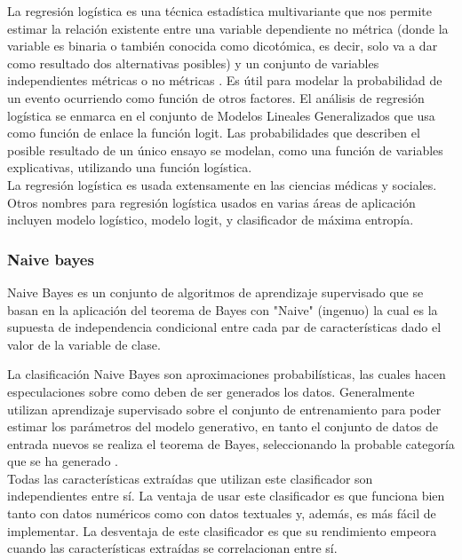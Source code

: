 La regresión logística es una técnica estadística multivariante que nos permite estimar la relación existente entre una variable dependiente 
no métrica (donde la variable es binaria o también conocida como dicotómica, es decir, solo va a dar como resultado dos alternativas posibles) 
y un conjunto de variables independientes métricas o no métricas \citep{CT6}. Es útil para modelar la probabilidad de un evento ocurriendo como 
función de otros factores. El análisis de regresión logística se enmarca en el conjunto de Modelos Lineales Generalizados que usa como función de 
enlace la función logit. Las probabilidades que describen el posible resultado de un único ensayo se modelan, como una función de variables explicativas, 
utilizando una función logística.\\

La regresión logística es usada extensamente en las ciencias médicas y sociales. Otros nombres para regresión logística usados en varias áreas de 
aplicación incluyen modelo logístico, modelo logit, y clasificador de máxima entropía.


\subsubsection{Naive bayes}

Naive Bayes es un conjunto de algoritmos de aprendizaje supervisado que se basan en la aplicación del teorema de Bayes con "Naive" 
(ingenuo) la cual es la supuesta de independencia condicional entre cada par de características dado el valor de la variable de clase. 

La clasificación Naive Bayes son aproximaciones probabilísticas, las cuales hacen especulaciones sobre como deben de ser 
generados los datos. Generalmente utilizan aprendizaje supervisado sobre el conjunto de entrenamiento para poder estimar los parámetros 
del modelo generativo, en tanto el conjunto de datos de entrada nuevos se realiza el teorema de Bayes, seleccionando la probable categoría 
que se ha generado \citep{CT7}.
\\
Todas las características extraídas que utilizan este clasificador son independientes entre sí. La ventaja de usar este clasificador es que 
funciona bien tanto con datos numéricos como con datos textuales y, además, es más fácil de implementar. La desventaja de este clasificador es 
que su rendimiento empeora cuando las características extraídas se correlacionan entre sí.

